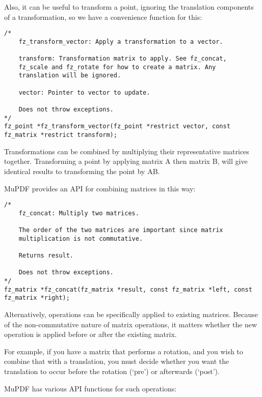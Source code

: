 \documentclass[oneside]{book}
\begin{document}
Also, it can be useful to transform a point, ignoring the translation components of a transformation, so we have a convenience function for this:

\begin{lstlisting}
/*
	fz_transform_vector: Apply a transformation to a vector.

	transform: Transformation matrix to apply. See fz_concat,
	fz_scale and fz_rotate for how to create a matrix. Any
	translation will be ignored.

	vector: Pointer to vector to update.

	Does not throw exceptions.
*/
fz_point *fz_transform_vector(fz_point *restrict vector, const fz_matrix *restrict transform);
\end{lstlisting}

Transformations can be combined by multiplying their representative matrices together. Transforming a point by applying matrix A then matrix B, will give identical results to transforming the point by AB.

MuPDF provides an API for combining matrices in this way:

\begin{lstlisting}
/*
	fz_concat: Multiply two matrices.

	The order of the two matrices are important since matrix
	multiplication is not commutative.

	Returns result.

	Does not throw exceptions.
*/
fz_matrix *fz_concat(fz_matrix *result, const fz_matrix *left, const fz_matrix *right);
\end{lstlisting}

Alternatively, operations can be specifically applied to existing matrices. Because of the non-commutative nature of matrix operations, it matters whether the new operation is applied before or after the existing matrix.

For example, if you have a matrix that performs a rotation, and you wish to combine that with a translation, you must decide whether you want the translation to occur before the rotation (`pre') or afterwards (`post').

MuPDF has various API functions for such operations:
\end{document}
